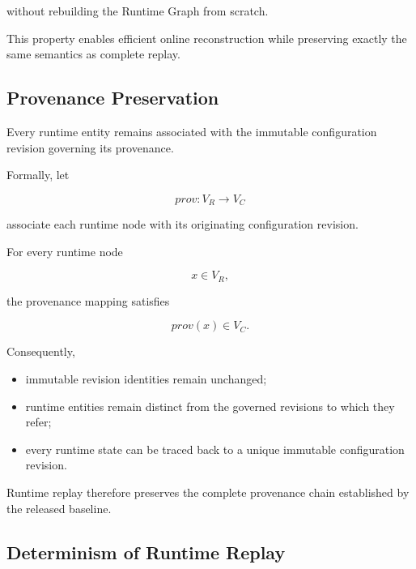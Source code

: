 \documentclass[10pt]{article}
\begin{document}
without rebuilding the Runtime Graph from scratch.

This property enables efficient online reconstruction while preserving exactly the same semantics as complete replay.

\subsection{Provenance Preservation}
\label{appendix:runtime_provenance}

Every runtime entity remains associated with the immutable configuration
revision governing its provenance.

Formally, let

\begin{equation}
	prov
	:
	V_R
	\rightarrow
	V_C
	\label{eq:runtime_provenance}
\end{equation}

associate each runtime node with its originating configuration revision.

For every runtime node

\[
x\in V_R,
\]

the provenance mapping satisfies

\begin{equation}
	prov(x)
	\in
	V_C.
	\label{eq:runtime_baseline_provenance}
\end{equation}

Consequently,

\begin{itemize}
	\item immutable revision identities remain unchanged;
	\item runtime entities remain distinct from the governed revisions to which
	they refer;
	\item every runtime state can be traced back to a unique immutable
	configuration revision.
\end{itemize}

Runtime replay therefore preserves the complete provenance chain established by the released baseline.

\subsection{Determinism of Runtime Replay}
\label{appendix:runtime_determinism}
\end{document}
